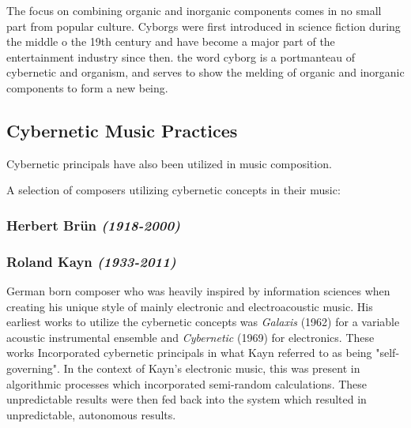The focus on combining organic and inorganic components comes in no small part from popular culture. Cyborgs were first introduced in science fiction during the middle o the 19th century and have become a major part of the entertainment industry since then. the word cyborg is a portmanteau of cybernetic and organism, and serves to show the melding of organic and inorganic components to form a new being.

\subsection{Cybernetic Music Practices}
Cybernetic principals have also been utilized in music composition. %

A selection of composers utilizing cybernetic concepts in their music:

\subsubsection{Herbert Brün \textit{(1918-2000)}}



\subsubsection{Roland Kayn \textit{(1933-2011)}}
German born composer who was heavily inspired by information sciences when creating his unique style of mainly electronic and electroacoustic music.\cite{rolandKaynBio} His earliest works to utilize the cybernetic concepts was \textit{Galaxis} (1962) for a variable acoustic instrumental ensemble and \textit{Cybernetic} (1969) for electronics. These works Incorporated cybernetic principals in what Kayn referred to as being "self-governing".\cite{rolandKaynBio} In the context of Kayn's electronic music, this was present in algorithmic processes which incorporated semi-random calculations. These unpredictable results were then fed back into the system which resulted in unpredictable, autonomous results.\cite{rolandKaynBio}

